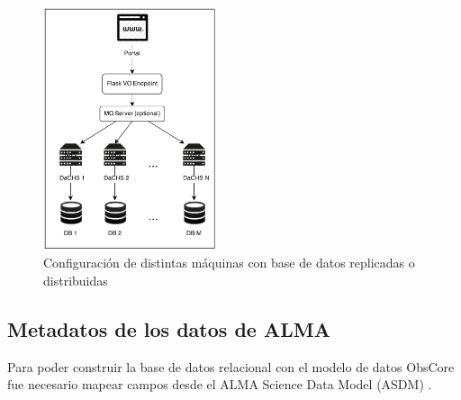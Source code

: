 \begin{figure}[h]
    \centering
    \includegraphics[width=0.45\textwidth]{images/interaccion.png}
    \caption{Configuración de distintas máquinas con base de datos replicadas o distribuidas}
    \label{fig:dachs}
\end{figure}

\subsection{Metadatos de los datos de ALMA}

Para poder construir la base de datos relacional con el modelo de datos ObsCore fue
necesario mapear campos desde el ALMA Science Data Model (ASDM) \cite{viallefond2009sdm}.

